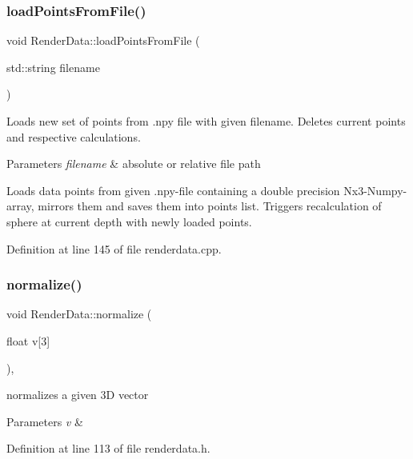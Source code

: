 \subsubsection{\texorpdfstring{load\+Points\+From\+File()}{loadPointsFromFile()}}
{\footnotesize\ttfamily void Render\+Data\+::load\+Points\+From\+File (\begin{DoxyParamCaption}\item[{std\+::string}]{filename }\end{DoxyParamCaption})}

Loads new set of points from .npy file with given filename. Deletes current points and respective calculations. 
\begin{DoxyParams}{Parameters}
{\em filename} & absolute or relative file path\\
\hline
\end{DoxyParams}
Loads data points from given .npy-\/file containing a double precision Nx3-\/\+Numpy-\/array, mirrors them and saves them into points list. Triggers recalculation of sphere at current depth with newly loaded points. 

Definition at line 145 of file renderdata.\+cpp.

\mbox{\label{class_render_data_ad8c590fd11eda06875112a74d318267f}} 
\subsubsection{\texorpdfstring{normalize()}{normalize()}}
{\footnotesize\ttfamily void Render\+Data\+::normalize (\begin{DoxyParamCaption}\item[{float}]{v\mbox{[}3\mbox{]} }\end{DoxyParamCaption})\hspace{0.3cm}{\ttfamily [inline]}, {\ttfamily [private]}}

normalizes a given 3D vector 
\begin{DoxyParams}{Parameters}
{\em v} & \\
\hline
\end{DoxyParams}


Definition at line 113 of file renderdata.\+h.

\mbox{\label{class_render_data_a7b32e615d46ac5ffbd3d14de0da2c406}} 
